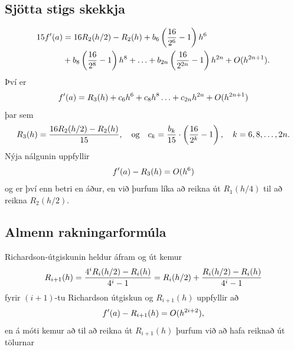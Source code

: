 \documentclass[A4paper,10pt,icelandic]{sphinxmanual}
\begin{document}
\subsection{Sjötta stigs skekkja}
\label{kafli04:sjotta-stigs-skekkja}\begin{gather}
\begin{split}\begin{aligned}
  15f'(a) &= 16 R_2(h/2) - R_2(h)
  + b_6 \left( \frac{16}{2^6} - 1 \right) h^6 \\
  &+ b_8 \left( \frac{16}{2^8} - 1 \right) h^8
  + \ldots
  + b_{2n} \left( \frac{16}{2^{2n}} - 1 \right) h^{2n}
  + O(h^{2n+1}).\end{aligned}\end{split}\notag
\end{gather}
Því er
\begin{gather}
\begin{split}f'(a) = R_3(h) + c_6 h^6 + c_8 h^8 \ldots + c_{2n} h^{2n}
  + O(h^{2n+1})\end{split}\notag
\end{gather}
þar sem
\begin{gather}
\begin{split}R_3(h) = \frac{16 R_2(h/2) - R_2(h)}{15},
  \quad \text{og} \quad
  c_k = \frac{b_k}{15} \cdot \left( \frac{16}{2^k} - 1 \right),
  \quad k = 6,8,\ldots,2n.\end{split}\notag
\end{gather}
Nýja nálgunin uppfyllir
\begin{gather}
\begin{split}f'(a) - R_3(h) = O(h^6)\end{split}\notag
\end{gather}
og er því enn betri en áður, en við þurfum líka að reikna út
\(R_1(h/4)\) til að reikna \(R_2(h/2)\).


\subsection{Almenn rakningarformúla}
\label{kafli04:almenn-rakningarformula}
Richardson-útgiskunin heldur áfram og út kemur
\begin{gather}
\begin{split}R_{i+1}(h) = \frac{4^i R_i(h/2) - R_i(h)}{4^i-1}
  = R_i(h/2) + \frac{R_i(h/2)-R_i(h)}{4^i-1}\end{split}\notag
\end{gather}
fyrir \((i+1)\)-tu Richardson útgiskun og \(R_{i+1}(h)\)
uppfyllir að
\begin{gather}
\begin{split}f'(a) - R_{i+1}(h) = O(h^{2i+2}),\end{split}\notag
\end{gather}
en á móti kemur að til að reikna út \(R_{i+1}(h)\) þurfum við að
hafa reiknað út tölurnar
\end{document}
